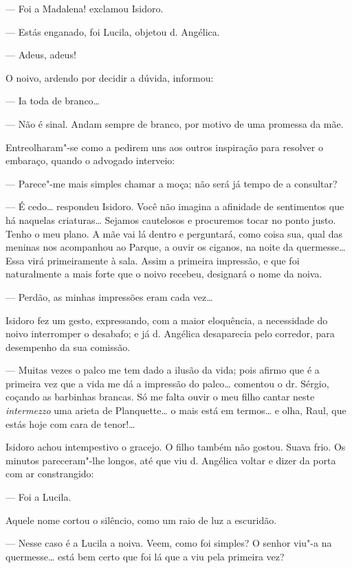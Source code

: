 --- Foi a Madalena! exclamou Isidoro.

--- Estás enganado, foi Lucila, objetou d. Angélica.

--- Adeus, adeus!

O noivo, ardendo por decidir a dúvida, informou:

--- Ia toda de branco\ldots{}

--- Não é sinal. Andam sempre de branco, por motivo de uma promessa da
mãe.

Entreolharam"-se como a pedirem uns aos outros inspiração para resolver o
embaraço, quando o advogado interveio:

--- Parece"-me mais simples chamar a moça; não será já tempo de a
consultar?

--- É cedo\ldots{} respondeu Isidoro. Você não imagina a afinidade de
sentimentos que há naquelas criaturas\ldots{} Sejamos cautelosos e procuremos
tocar no ponto justo. Tenho o meu plano. A mãe vai lá dentro e
perguntará, como coisa sua, qual das meninas nos acompanhou ao Parque, a
ouvir os ciganos, na noite da quermesse\ldots{} Essa virá primeiramente à
sala. Assim a primeira impressão, e que foi naturalmente a mais forte
que o noivo recebeu, designará o nome da noiva.

--- Perdão, as minhas impressões eram cada vez\ldots{}

Isidoro fez um gesto, expressando, com a maior eloquência, a necessidade
do noivo interromper o desabafo; e já d. Angélica desaparecia pelo
corredor, para desempenho da sua comissão.

--- Muitas vezes o palco me tem dado a ilusão da vida; pois afirmo que é
a primeira vez que a vida me dá a impressão do palco\ldots{} comentou o dr.
Sérgio, coçando as barbinhas brancas. Só me falta ouvir o meu filho
cantar neste \emph{intermezzo} uma arieta de Planquette\ldots{} o mais está
em termos\ldots{} e olha, Raul, que estás hoje com cara de tenor!\ldots{}

Isidoro achou intempestivo o gracejo. O filho também não gostou. Suava
frio. Os minutos pareceram"-lhe longos, até que viu d. Angélica voltar e
dizer da porta com ar constrangido:

--- Foi a Lucila.

Aquele nome cortou o silêncio, como um raio de luz a escuridão.

--- Nesse caso é a Lucila a noiva. Veem, como foi simples? O senhor
viu"-a na quermesse\ldots{} está bem certo que foi lá que a viu pela primeira
vez?

